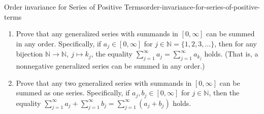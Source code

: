 \begin{mystexercise}{Order invariance for Series of Positive Terms}{order-invariance-for-series-of-positive-terms}\label{Order-invariance-for-Series-of-Positive-Terms-}\label{order-invariance-for-series-of-positive-terms}\begin{enumerate}
\item Prove that any generalized series with summands in $[0, \infty]$ can be summed in any order. Specifically, if $a_j \in [0, \infty]$ for $j \in \mathbb{N} = \{1, 2, 3, \dots\}$, then for any bijection $\mathbb{N} \to \mathbb{N},\ j \mapsto k_j$, the equality $\sum_{j=1}^\infty a_j = \sum_{j=1}^\infty a_{k_j}$ holds. (That is, a nonnegative generalized series can be summed in any order.)
\item Prove that any two generalized series with summands in $[0, \infty]$ can be summed as one series. Specifically, if $a_j, b_j \in [0, \infty]$ for $j \in \mathbb{N}$, then the equality $\sum_{j=1}^\infty a_j + \sum_{j=1}^\infty b_j = \sum_{j=1}^\infty (a_j + b_j)$ holds.
\end{enumerate}

\end{mystexercise}
